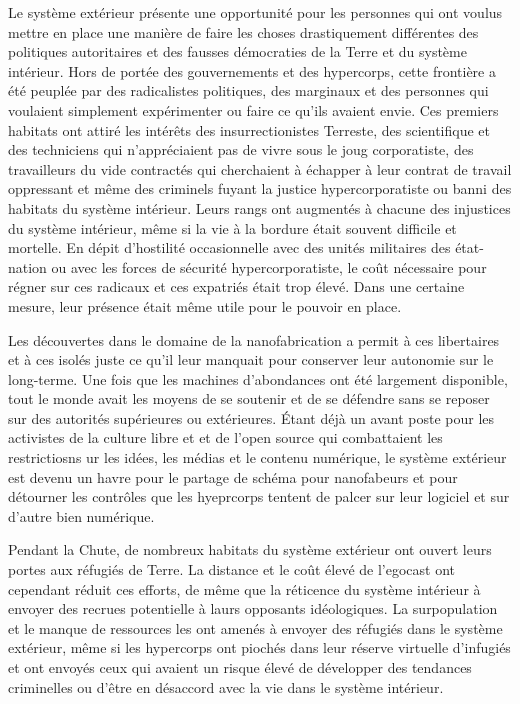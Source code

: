                               Le système extérieur présente une opportunité pour les personnes qui ont voulus mettre en place une manière de faire les choses drastiquement différentes des politiques autoritaires et des fausses démocraties de la Terre et du système intérieur. Hors de portée des gouvernements et des hypercorps, cette frontière a été peuplée par des radicalistes politiques, des marginaux et des personnes qui voulaient simplement expérimenter ou faire ce qu'ils avaient envie. Ces premiers habitats ont attiré les intérêts des insurrectionistes Terreste, des scientifique et des techniciens qui n'appréciaient pas de vivre sous le joug corporatiste, des travailleurs du vide contractés qui cherchaient à échapper à leur contrat de travail oppressant et même des criminels fuyant la justice hypercorporatiste ou banni des habitats du système intérieur. Leurs rangs ont augmentés à chacune des injustices du système intérieur, même si la vie à la bordure était souvent difficile et mortelle. En dépit d'hostilité occasionnelle avec des unités militaires des état-nation ou avec les forces de sécurité hypercorporatiste, le coût nécessaire pour régner sur ces radicaux et ces expatriés était trop élevé. Dans une certaine mesure, leur présence était même utile pour le pouvoir en place. 

                              Les découvertes dans le domaine de la nanofabrication a permit à ces libertaires et à ces isolés juste ce qu'il leur manquait pour conserver leur autonomie sur le long-terme. Une fois que les machines d'abondances ont été largement disponible, tout le monde avait les moyens de se soutenir et de se défendre sans se reposer sur des autorités supérieures ou extérieures. Étant déjà un avant poste pour les activistes de la culture libre et et de l'open source qui combattaient les restrictiosns ur les idées, les médias et le contenu numérique, le système extérieur est devenu un havre pour le partage de schéma pour nanofabeurs et pour détourner les contrôles que les hyeprcorps tentent de palcer sur leur logiciel et sur d'autre bien numérique. 

                              Pendant la Chute, de nombreux habitats du système extérieur ont ouvert leurs portes aux réfugiés de Terre. La distance et le coût élevé de l'egocast ont cependant réduit ces efforts, de même que la réticence du système intérieur à envoyer des recrues potentielle à laurs opposants idéologiques. La surpopulation et le manque de ressources les ont amenés à envoyer des réfugiés dans le système extérieur, même si les hypercorps ont piochés dans leur réserve virtuelle d'infugiés et ont envoyés ceux qui avaient un risque élevé de développer des tendances criminelles ou d'être en désaccord avec la vie dans le système intérieur. 

